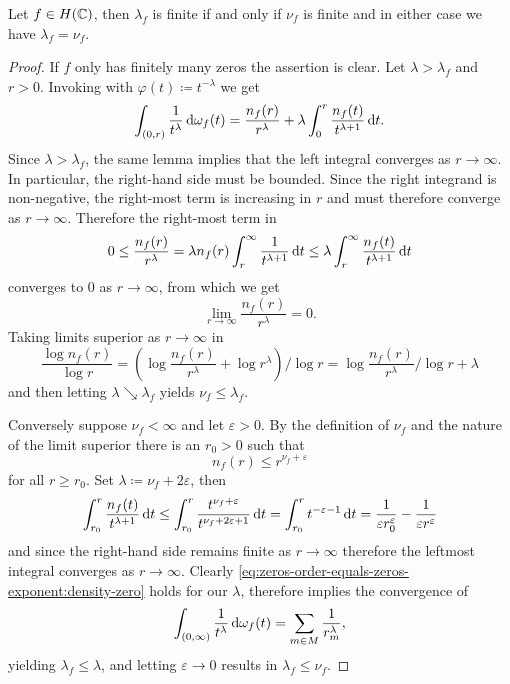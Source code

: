 \begin{proposition} \label{prop:zeros-order-equals-zeros-exponent}
    Let $f \in H(\mathbb{C})$, then $\lambda_f$ is finite if and only if $\nu_f$ is finite and in either case we have $\lambda_f = \nu_f$.
\end{proposition}

\begin{proof}
    If $f$ only has finitely many zeros the assertion is clear. Let $\lambda > \lambda_f$ and $r > 0$. Invoking  with $\varphi(t) \coloneqq t^{-\lambda}$ we get
    \begin{equation*}
        \int_{(0, r)} \frac{1}{t^\lambda} \mathop{}\!\mathrm{d} \omega_f(t) = \frac{n_f(r)}{r^\lambda} + \lambda \int_0^r \frac{n_f(t)}{t^{\lambda + 1}} \mathop{}\!\mathrm{d} t.
    \end{equation*}
    Since $\lambda > \lambda_f$, the same lemma implies that the left integral converges as $r \to \infty$. In particular, the right-hand side must be bounded. Since the right integrand is non-negative, the right-most term is increasing in $r$ and must therefore converge as $r \to \infty$. Therefore the right-most term in
    $$ 0 \leq \frac{n_f(r)}{r^\lambda} = \lambda n_f(r) \int_r^\infty \frac{1}{t^{\lambda + 1}} \mathop{}\!\mathrm{d} t \leq \lambda \int_r^\infty \frac{n_f(t)}{t^{\lambda + 1}} \mathop{}\!\mathrm{d} t $$
    converges to $0$ as $r \to \infty$, from which we get
    \begin{equation} \label{eq:zeros-order-equals-zeros-exponent:density-zero}
        \lim_{r \to \infty} \frac{n_f(r)}{r^\lambda} = 0.
    \end{equation}
    Taking limits superior as $r \to \infty$ in
    $$ \frac{\log n_f(r)}{\log r} = \left( \log \frac{n_f(r)}{r^\lambda} + \log r^\lambda\right)/{\log r} = \log \frac{n_f(r)}{r^\lambda} / \log r + \lambda $$
    and then letting $\lambda \searrow \lambda_f$ yields $\nu_f \leq \lambda_f$.

    Conversely suppose $\nu_f < \infty$ and let $\varepsilon > 0$. By the definition of $\nu_f$ and the nature of the limit superior there is an $r_0 > 0$ such that
    $$ n_f(r) \leq r^{\nu_f + \varepsilon} $$
    for all $r \geq r_0$. Set $\lambda \coloneqq \nu_f + 2 \varepsilon$, then
    \begin{equation*}
        \int_{r_0}^r \frac{n_f(t)}{t^{\lambda + 1}} \mathop{}\!\mathrm{d} t \leq
        \int_{r_0}^r \frac{t^{\nu_f + \varepsilon}}{t^{\nu_f + 2\varepsilon + 1}} \mathop{}\!\mathrm{d} t =
        \int_{r_0}^r t^{-\varepsilon - 1} \mathop{}\!\mathrm{d} t = \frac{1}{\varepsilon r_0^{\varepsilon}} - \frac{1}{\varepsilon r^{\varepsilon}}
    \end{equation*}
    and since the right-hand side remains finite as $r \to \infty$ therefore the leftmost integral converges as $r \to \infty$. Clearly \eqref{eq:zeros-order-equals-zeros-exponent:density-zero} holds for our $\lambda$, therefore  implies the convergence of
    \begin{equation*}
        \int_{(0, \infty)} \frac{1}{t^\lambda} \mathop{}\!\mathrm{d} \omega_f(t) = \sum_{m \in M} \frac{1}{r_m^\lambda},
    \end{equation*}
    yielding $\lambda_f \leq \lambda$, and letting $\varepsilon \to 0$ results in $\lambda_f \leq \nu_f$.
\end{proof}

